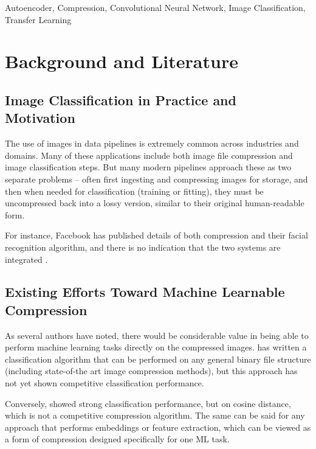 \documentclass[twoside,11pt]{article}
\begin{document}
\begin{keywords}
    Autoencoder, Compression, Convolutional Neural Network, Image Classification,
    Transfer Learning
\end{keywords}




\section{Background and Literature}

\subsection{Image Classification in Practice and Motivation}
The use of images in data pipelines is extremely common across industries and 
domains. Many of these applications include both image file compression and 
image classification steps. But many modern pipelines approach these as two 
separate problems – often first ingesting and compressing
images for storage, and then when needed for classification 
(training or fitting), they must be uncompressed back into a lossy version, 
similar to their original human-readable form.

 For instance, Facebook has published details of both compression and their 
facial recognition algorithm, and there is no indication that the two systems 
are integrated \citep{collet2016zstandard, taigman2014deepface}.

\subsection{Existing Efforts Toward Machine Learnable Compression}

As several authors have noted, 
there would be considerable value in being able to perform machine learning 
tasks directly on the compressed images. \citet{needell2017} has written a classification 
algorithm that can be performed on any general binary file structure (including 
state-of-the art image compression methods), but this approach has not yet shown
 competitive classification performance. 

Conversely, \citet{fu2016} showed strong 
classification performance, but on cosine distance, which is not a competitive 
compression algorithm. The same can be said for any approach that performs 
embeddings or feature extraction, which can be viewed as a form of compression 
designed specifically for one ML task.
\end{document}

